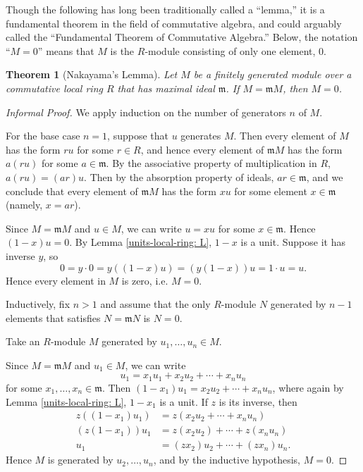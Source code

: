 \documentclass[12pt]{amsart}
\newtheorem{theorem}{Theorem}
\theoremstyle{definition}
\theoremstyle{remark}
\begin{document}
Though the following has long been traditionally called a ``lemma,'' it is a fundamental theorem in the field of commutative algebra, and could arguably called the ``Fundamental Theorem of Commutative Algebra.'' 
Below, the notation ``$M=0$'' means that $M$ is the $R$-module consisting of only one element, $0$. 


\begin{theorem}[Nakayama's Lemma]
	Let $M$ be a finitely generated module over a commutative local ring $R$ that has maximal ideal $\mathfrak{m}$. 
	If $M = \mathfrak{m}M$, then $M=0$. 
\end{theorem}

\begin{proof}[Informal Proof]
We apply induction on the number of generators $n$ of $M$. 

For the base case $n=1$, suppose that $u$ generates $M$.	
Then every element of $M$ has the form $ru$ for some $r \in R$, and hence every element of $\mathfrak{m}M$ has the form $a(ru) $
for some $a \in    \mathfrak{m}$. 
By the associative  property of multiplication in $R$, $a(ru) = (ar)u$.  
Then by the absorption property of ideals, $ar \in \mathfrak{m}$, and we conclude that every element of $\mathfrak{m}M$ has the form $xu$ for some element $x \in \mathfrak{m}$ (namely, $x = ar$). 

Since $M = \mathfrak{m} M$ and $u \in M$, we can write $u = xu$ for some $x \in \mathfrak{m}$.  Hence $(1-x) u = 0$.
By Lemma \ref{units-local-ring: L},  $1-x$ is a unit.  Suppose it has inverse $y$,  so \[ 0 = y \cdot 0= y((1-x)u) = (y(1-x)) u = 1 \cdot u = u. \]  Hence every element in $M$ is zero, i.e. $M=0$.

Inductively, fix  $n > 1$ and assume that the only $R$-module $N$ generated by $n-1$ elements that satisfies $N = \mathfrak{m}N$ is $N=0$.

Take an $R$-module $M$ generated by $u_1, \ldots, u_n \in M$. 

Since $M = \mathfrak{m}M$ and $u_1 \in M$, we can write 
\[
u_1 = x_1 u_1 + x_2 u_2 + \cdots + x_n u_n
\]
for some $x_1, \ldots, x_n \in \mathfrak{m}$. 
Then $(1-x_1)u_1 =  x_2 u_2 + \cdots + x_n u_n$, where again by Lemma \ref{units-local-ring: L}, $1-x_1$ is a unit. 
If $z$ is its inverse, then 
\begin{align*}
z ((1-x_1)u_1)  &= z( x_2 u_2 + \cdots + x_n u_n ) \\
(z (1-x_1))u_1 &= z( x_2 u_2 ) + \cdots + z (x_n u_n) \\
u_1 &= (z x_2) u_2 + \cdots + (z x_n) u_n. 
\end{align*}
Hence $M$ is generated by $u_2, \ldots, u_n$, and by the inductive hypothesis, 
$M = 0$.
\end{proof}
\end{document}
